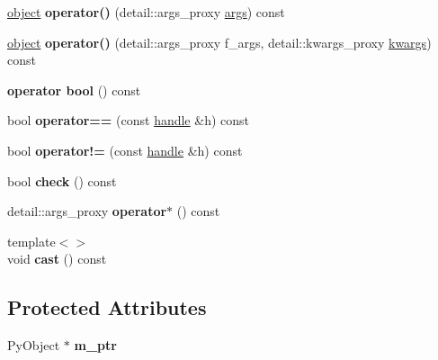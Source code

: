\begin{DoxyCompactItemize}
\item 
\hyperlink{classobject}{object} {\bfseries operator()} (detail\+::args\+\_\+proxy \hyperlink{classargs}{args}) const \hypertarget{classhandle_a5d2160d5be9250dfec6a8ad439807d33}{}\label{classhandle_a5d2160d5be9250dfec6a8ad439807d33}

\item 
\hyperlink{classobject}{object} {\bfseries operator()} (detail\+::args\+\_\+proxy f\+\_\+args, detail\+::kwargs\+\_\+proxy \hyperlink{classkwargs}{kwargs}) const \hypertarget{classhandle_a31612fdbd501968a01c6dd482fb24cc2}{}\label{classhandle_a31612fdbd501968a01c6dd482fb24cc2}

\item 
{\bfseries operator bool} () const \hypertarget{classhandle_a5205a17a2c6cbdb223f228f51b89befc}{}\label{classhandle_a5205a17a2c6cbdb223f228f51b89befc}

\item 
bool {\bfseries operator==} (const \hyperlink{classhandle}{handle} \&h) const \hypertarget{classhandle_ad6d0a0adff270dc98b0d2d98080ca821}{}\label{classhandle_ad6d0a0adff270dc98b0d2d98080ca821}

\item 
bool {\bfseries operator!=} (const \hyperlink{classhandle}{handle} \&h) const \hypertarget{classhandle_a2196545c81165dd48618616f620f9816}{}\label{classhandle_a2196545c81165dd48618616f620f9816}

\item 
bool {\bfseries check} () const \hypertarget{classhandle_af27a485593721775f6023c765f5f96dd}{}\label{classhandle_af27a485593721775f6023c765f5f96dd}

\item 
detail\+::args\+\_\+proxy {\bfseries operator$\ast$} () const \hypertarget{classhandle_ae407e4e6589de1d24bb303f054747516}{}\label{classhandle_ae407e4e6589de1d24bb303f054747516}

\item 
{\footnotesize template$<$$>$ }\\void {\bfseries cast} () const \hypertarget{classhandle_af087378ba0223483219d877776f490ab}{}\label{classhandle_af087378ba0223483219d877776f490ab}

\end{DoxyCompactItemize}
\subsection*{Protected Attributes}
\begin{DoxyCompactItemize}
\item 
Py\+Object $\ast$ {\bfseries m\+\_\+ptr}\hypertarget{classhandle_a1e9241eea11b47aa15559ccf6fb229f6}{}\label{classhandle_a1e9241eea11b47aa15559ccf6fb229f6}

\end{DoxyCompactItemize}


